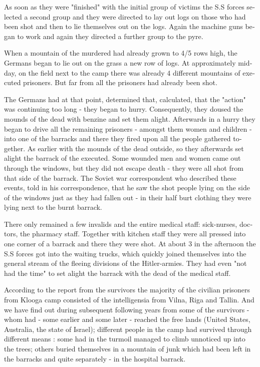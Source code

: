 \documentclass{article}
\begin{document}
\begin{pairs}
\begin{Leftside}
\begin{english}
As soon as they were "finished" with the initial group of victims
the S.S forces selected a second group and they were directed to lay out logs on those who had been shot and then
to lie themselves out on the logs. Again the machine guns began to work and again they directed a further group to the
pyre.

When a mountain of the murdered had already grown to 4/5 rows high, the Germans began to lie out on the grass
a new row of logs. At approximately midday, on the field next to the camp there was already 4 different mountains
of executed prisoners. But far from all the prisoners had already been shot.

The Germans had at that point, determined that, calculated, that the "action" was continuing too long - they began to hurry.
Consequently, they doused the mounds of the dead with benzine and set them alight. Afterwards in a hurry they began 
to drive all the remaining prisoners - amongst them women and children - into one of the barracks and there they 
fired upon all the people gathered together. As earlier with the mounds of the dead outside, so they afterwards set alight
the barrack of the executed. Some wounded men and women came out through the windows, but they did not escape
death - they were all shot from that side of the barrack. The Soviet war correspondent who described these events,
told in his correspondence, that he saw the shot people lying on the side of the windows just as they had fallen out -
in their half burt clothing they were lying next to the burnt barrack.

There only remained a few invalids and the entire medical staff: sick-nurses, doctors, the pharmacy staff. Together with kitchen
staff they were all pressed into one corner of a barrack and there they were shot.  At about 3 in the afternoon the S.S forces 
got into the waiting trucks, which quickly joined themselves into the general stream of the fleeing divisions of the Hitler-armies.
They had even "not had the time" to set alight the barrack with the dead of the medical staff.

According to the report from the survivors the majority of the civilian prisoners from Klooga camp consisted of the intelligensia
from Vilna, Riga and Tallin. And we have find out during subsequent following years from some of the survivors - 
whom had - some earlier and some later - reached the free lands (United States, Australia, the state of Israel);
different people in the camp had survived through different means : some had in the turmoil managed to climb
unnoticed up into the trees; others buried themselves in a mountain of junk which had been left in the barracks and 
quite separately -  in the hospital barrack.

\endnumbering
\end{english}
\end{Leftside}

\end{pairs}
\Columns
\end{document}
